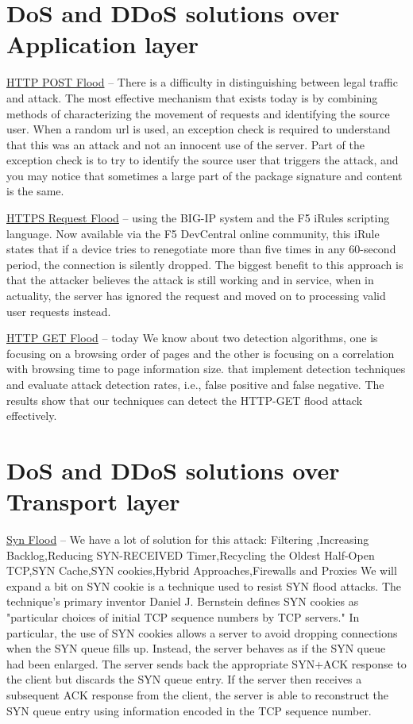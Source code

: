 \documentclass{report}
\begin{document}
\section{DoS and DDoS solutions over Application layer}
 

 \hfill \break \underline{HTTP POST Flood} – There is a difficulty in distinguishing between legal traffic and attack.
The most effective mechanism that exists today is by combining methods of characterizing the movement of requests and identifying the source user.
When a random url is used, an exception check is required to understand that this was an attack and not an innocent use of the server. Part of the exception check is to try to identify the source user that triggers the attack, and you may notice that sometimes a large part of the package signature and content is the same.

 \hfill \break\underline{HTTPS Request Flood} – using the BIG-IP system and the F5 iRules scripting language.
Now available via the F5 DevCentral online community, this iRule states that if a device tries to renegotiate more than five times in any 60-second period, the connection is silently dropped.
The biggest benefit to this approach is that the attacker believes the attack is still working and in service, when in actuality, the server has ignored the request and moved on to processing valid user requests instead.


 \hfill \break\underline{HTTP GET Flood} – today We know about two detection algorithms, one is focusing on a browsing order of pages and the other is focusing on a correlation with browsing time to page information size. that implement detection techniques and evaluate attack detection rates, i.e., false positive and false negative. The results show that our techniques can detect the HTTP-GET flood attack effectively.


\section {DoS and DDoS solutions over Transport layer} 

 \hfill \break \underline{Syn Flood} – We have a lot of solution for this attack:
Filtering ,Increasing Backlog,Reducing SYN-RECEIVED Timer,Recycling the Oldest Half-Open TCP,SYN Cache,SYN cookies,Hybrid Approaches,Firewalls and Proxies
We will expand a bit on SYN cookie is a technique used to resist SYN flood attacks. The technique's primary inventor Daniel J. Bernstein defines SYN cookies as "particular choices of initial TCP sequence numbers by TCP servers." In particular, the use of SYN cookies allows a server to avoid dropping connections when the SYN queue fills up. Instead, the server behaves as if the SYN queue had been enlarged. The server sends back the appropriate SYN+ACK response to the client but discards the SYN queue entry. If the server then receives a subsequent ACK response from the client, the server is able to reconstruct the SYN queue entry using information encoded in the TCP sequence number.
\end{document}
